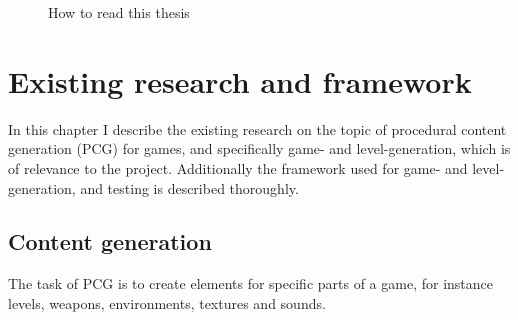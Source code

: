 \documentclass[a4paper,titlepage,final]{report}
\begin{document}
\begin{figure}[!ht]
\caption{How to read this thesis}
\label{fig:howtoread}
\end{figure}


\chapter{Existing research and framework}
\label{ch_existingresearch}
In this chapter I describe the existing research on the topic of procedural content generation (PCG) for games, and specifically game- and level-generation, which is of relevance to the project.
Additionally the framework used for game- and level-generation, and testing is described thoroughly.



\section{Content generation}
\label{sec_contengen}
The task of PCG is to create elements for specific parts of a game, for instance levels, weapons, environments, textures and sounds. 
\end{document}
